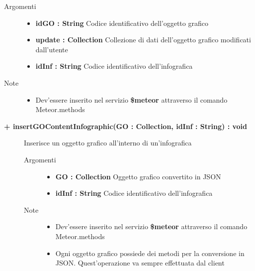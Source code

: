 \begin{description}
\begin{description}
		\begin{description}
			\item[Argomenti] \hfill
				\begin{itemize}
				
					\item \textbf{idGO :  String			} \hfill
					Codice identificativo dell'oggetto grafico
					\item \textbf{update : Collection			} \hfill
					Collezione di dati dell'oggetto grafico modificati dall'utente
					\item \textbf{idInf :  String			} \hfill
					Codice identificativo dell'infografica
					
				\end{itemize}
			\item[Note] \hfill
			\begin{itemize}
					\item Dev'essere inserito nel servizio \textbf{\$meteor} attraverso il comando Meteor.methods
				\end{itemize}
		\end{description}
	\end{description}
	
	\begin{description}
		\item[\textbf{\color{blue}+ insertGOContentInfographic(GO : Collection, idInf : String) : void			}] \hfill
			Inserisce un oggetto grafico all'interno di un'infografica
			
		\begin{description}
			\item[Argomenti] \hfill
				\begin{itemize}
				
					\item \textbf{GO : Collection			} \hfill
					Oggetto grafico convertito in JSON
					\item \textbf{idInf :  String			} \hfill
					Codice identificativo dell'infografica
					
				\end{itemize}
			\item[Note] \hfill
			\begin{itemize}
					\item Dev'essere inserito nel servizio \textbf{\$meteor} attraverso il comando Meteor.methods
					\item Ogni oggetto grafico possiede dei metodi per la conversione in JSON. Quest'operazione va sempre effettuata dal client
				\end{itemize}
		\end{description}
	\end{description}
	

\end{description}
